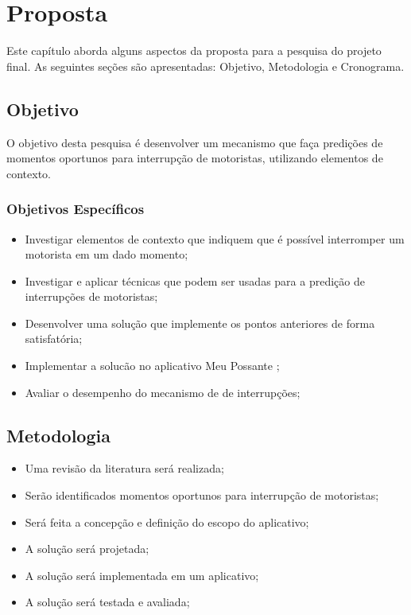 \chapter{Proposta}
\label{proposta}
Este capítulo aborda alguns aspectos da proposta para a pesquisa do projeto final. As seguintes seções são
apresentadas: Objetivo, Metodologia e Cronograma.

\section{Objetivo}
\label{objetivo}
O objetivo desta pesquisa é desenvolver um mecanismo que faça predições de momentos oportunos para interrupção de
motoristas, utilizando elementos de contexto.

\subsection{Objetivos Específicos}
\label{objetivos-esp}
\begin{itemize}
  \item Investigar elementos de contexto que indiquem que é possível interromper um motorista em um dado momento;
  \item Investigar e aplicar técnicas que podem ser usadas para a predição de interrupções de motoristas;
  \item Desenvolver uma solução que implemente os pontos anteriores de forma satisfatória;
  \item Implementar a solucão no aplicativo Meu Possante \cite{meupossante};
  \item Avaliar o desempenho do mecanismo de de interrupções;
\end{itemize}

\section{Metodologia}
\label{metodologia}
\begin{itemize}
  \item Uma revisão da literatura será realizada;
  \item Serão identificados momentos oportunos para interrupção de motoristas;
  \item Será feita a concepção e definição do escopo do aplicativo;
  \item A solução será projetada;
  \item A solução será implementada em um aplicativo;
  \item A solução será testada e avaliada;
\end{itemize}

